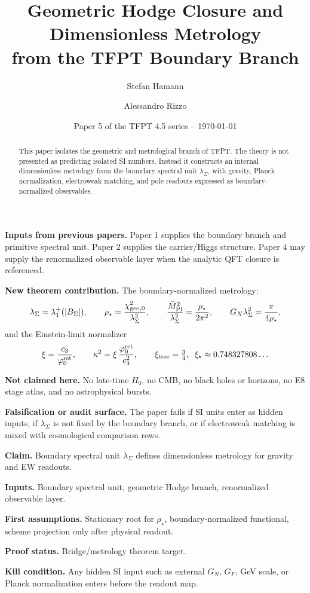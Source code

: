 \documentclass[11pt,a4paper]{article}
\title{\color{tfptblue}\textbf{Geometric Hodge Closure and Dimensionless Metrology}\\[0.35em]
{\Large from the TFPT Boundary Branch}}
\author{Stefan Hamann \and Alessandro Rizzo}
\date{{\normalsize\color{tfptgray}\sffamily Paper 5 of the TFPT 4.5 series -- \today}}
\begin{document}
\maketitle

\begin{abstract}
This paper isolates the geometric and metrological branch of TFPT. The theory is not presented as
predicting isolated SI numbers. Instead it constructs an internal dimensionless metrology from the
boundary spectral unit $\lambda_\Sigma$, with gravity, Planck normalization, electroweak matching,
and pole readouts expressed as boundary-normalized observables.
\end{abstract}

\begin{tfptfrontbox}
\textbf{Inputs from previous papers.} Paper 1 supplies the boundary branch and primitive spectral
unit. Paper 2 supplies the carrier/Higgs structure. Paper 4 may supply the renormalized observable
layer when the analytic QFT closure is referenced.

\textbf{New theorem contribution.} The boundary-normalized metrology:
\[
\lambda_\Sigma=\lambda_1^+(|B_\Sigma|),\qquad
\rho_\star=\frac{\chi_{\mathrm{geo},0}^2}{\lambda_\Sigma^2},\qquad
\frac{\bar M_{\mathrm{Pl}}^2}{\lambda_\Sigma^2}=\frac{\rho_\star}{2\pi^2},\qquad
G_N\lambda_\Sigma^2=\frac{\pi}{4\rho_\star},
\]
and the Einstein-limit normalizer
\[
\xi=\frac{c_3}{\varphi_0^{\mathrm{ret}}},
\qquad
\kappa^2=\xi\,\frac{\varphi_0^{\mathrm{ret}}}{c_3^2},
\qquad
\xi_{\mathrm{tree}}=\tfrac{3}{4},\;\;
\xi_\star\approx 0.748327808\ldots
\]

\textbf{Not claimed here.} No late-time $H_0$, no CMB, no black holes or horizons, no E8 stage
atlas, and no astrophysical bursts.

\textbf{Falsification or audit surface.} The paper fails if SI units enter as hidden inputs, if
$\lambda_\Sigma$ is not fixed by the boundary branch, or if electroweak matching is mixed with
cosmological comparison rows.
\end{tfptfrontbox}


\begin{tfptclaimcontract}
\textbf{Claim.} Boundary spectral unit $\lambda_\Sigma$ defines dimensionless metrology for gravity and EW readouts.\par
\textbf{Inputs.} Boundary spectral unit, geometric Hodge branch, renormalized observable layer.\par
\textbf{First assumptions.} Stationary root for $\rho_\star$, boundary-normalized functional, scheme projection only after physical readout.\par
\textbf{Proof status.} Bridge/metrology theorem target.\par
\textbf{Kill condition.} Any hidden SI input such as external $G_N$, $G_F$, GeV scale, or Planck normalization enters before the readout map.\par
\end{tfptclaimcontract}
\end{document}
